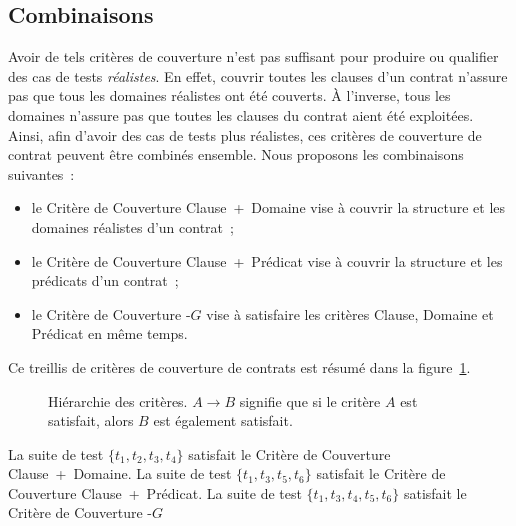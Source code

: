 \subsection{Combinaisons}
\label{subsection:test:combination}

Avoir de tels critères de couverture n'est pas suffisant pour produire ou
qualifier des cas de tests {\em réalistes}. En effet, couvrir toutes les clauses
d'un contrat n'assure pas que tous les domaines réalistes ont été couverts. À
l'inverse, tous les domaines n'assure pas que toutes les clauses du contrat
aient été exploitées. Ainsi, afin d'avoir des cas de tests plus réalistes, ces
critères de couverture de contrat peuvent être combinés ensemble. Nous proposons
les combinaisons suivantes~:
%
\begin{itemize}

\item le Critère de Couverture Clause~+~Domaine vise à couvrir la structure et
les domaines réalistes d'un contrat~;

\item le Critère de Couverture Clause~+~Prédicat vise à couvrir la structure et
les prédicats d'un contrat~;

\item le Critère de Couverture -$G$ vise à satisfaire les
critères Clause, Domaine et Prédicat en même temps.

\end{itemize}
%
Ce {\strong treillis} de critères de couverture de contrats est résumé dans la
figure~\ref{figure:test:lattice}.

\begin{figure}


\caption[Hiérarchie des critères.]{\label{figure:test:lattice} Hiérarchie des
critères. $A \rightarrow B$ signifie que si le critère $A$ est satisfait, alors
$B$ est également satisfait.}

\end{figure}

\begin{example}

La suite de test $\{t_1, t_2, t_3, t_4\}$ satisfait le Critère de Couverture
Clause~+~Domaine. La suite de test $\{t_1, t_3, t_5, t_6\}$ satisfait le Critère
de Couverture Clause~+~Prédicat. La suite de test $\{t_1, t_3, t_4, t_5, t_6\}$
satisfait le Critère de Couverture -$G$

\end{example}
